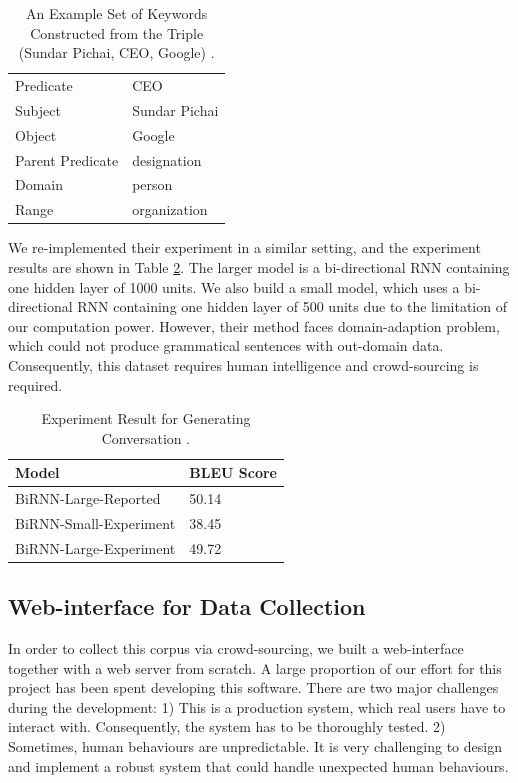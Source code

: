 \documentclass[bsc,frontabs,twoside,singlespacing,parskip,deptreport]{infthesis}     %
\begin{document}
\begin{table}[]
\centering
\begin{tabular}{|l|l|}
\hline
Predicate        & CEO           \\
Subject          & Sundar Pichai \\
Object           & Google        \\
Parent Predicate & designation   \\
Domain           & person        \\
Range            & organization  \\ \hline
\end{tabular}
\caption{An Example Set of Keywords Constructed from the Triple (Sundar Pichai, CEO, Google) \cite{indurthi2017generating}.}
\label{tab:keyword}
\end{table}

We re-implemented their experiment in a similar setting, and the experiment results are shown in Table \ref{tab:genresult}. The larger model is a bi-directional RNN containing one hidden layer of 1000 units. We also build a small model, which uses a bi-directional RNN containing one hidden layer of 500 units due to the limitation of our computation power. However, their method faces domain-adaption problem, which could not produce grammatical sentences with out-domain data. Consequently, this dataset requires human intelligence and crowd-sourcing is required. 

\begin{table}[]
\centering
\begin{tabular}{|l|l|}
\hline
Model                  & BLEU Score \\ \hline
BiRNN-Large-Reported   & 50.14      \\ \hline
BiRNN-Small-Experiment & 38.45      \\ \hline
BiRNN-Large-Experiment & 49.72      \\ \hline
\end{tabular}
\caption{Experiment Result for Generating Conversation \cite{indurthi2017generating}.}
\label{tab:genresult}
\end{table}

\subsection{Web-interface for Data Collection}

In order to collect this corpus via crowd-sourcing, we built a web-interface together with a web server from scratch. A large proportion of our effort for this project has been spent developing this software. There are two major challenges during the development: 1) This is a production system, which real users have to interact with. Consequently, the system has to be thoroughly tested. 2) Sometimes, human behaviours are unpredictable. It is very challenging to design and implement a robust system that could handle unexpected human behaviours.
\end{document}
